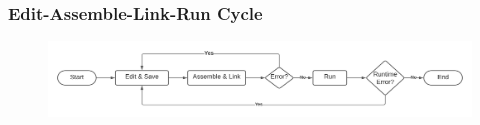 \documentclass[
	11pt, %
	hmargin=1cm,vmargin=0cm,head=0.5cm,headsep=0pt,foot=0.5cm,margin=2cm
]{beamer}
\begin{document}

\begin{frame}
	\frametitle{Edit-Assemble-Link-Run Cycle}
	\begin{figure}
		\includegraphics[width=\linewidth]{program_cycle.png}
	\end{figure}
\end{frame}
\end{document}
